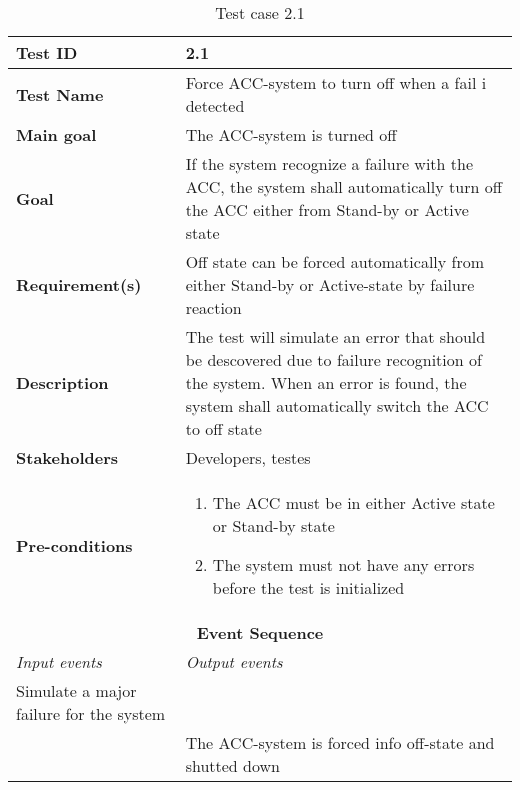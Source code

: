 \begin{table}[H]
\centering
\begin{tabularx}{\linewidth}{X|X}
    \hline
    \textbf{Test ID} & 2.1\\
    \hline
    \textbf{Test Name} &  Force ACC-system to turn off when a fail i detected\\
    \hline
    \textbf{Main goal} &  The ACC-system is turned off\\
    \hline
    \textbf{Goal} & If the system recognize a failure with the ACC, the system shall automatically turn off the ACC either from Stand-by or Active state \\
    \hline
    \textbf{Requirement(s)} &  Off state can be forced automatically from either Stand-by or Active-state by failure reaction\\
    \hline
    \textbf{Description} &  The test will simulate an error that should be descovered due to failure recognition of the system. When an error is found, the system shall automatically switch the ACC to off state\\
    \hline
    \textbf{Stakeholders} & Developers, testes \\
    \hline
    \textbf{Pre-conditions} & 
    \begin{enumerate}
        \item The ACC must be in either Active state or Stand-by state
        \item The system must not have any errors before the test is initialized
    \end{enumerate}\\
    \hline
    \multicolumn{2}{c}{\textbf{Event Sequence}} \\
    \hline
    \textit{Input events} & \textit{Output events} \\
    \hline
    Simulate a major failure for the system &  \\
    \hline
     & The ACC-system is forced info off-state and shutted down \\
    \hline
\end{tabularx}
\caption{\label{tab_case2_1} Test case 2.1}
\end{table}


